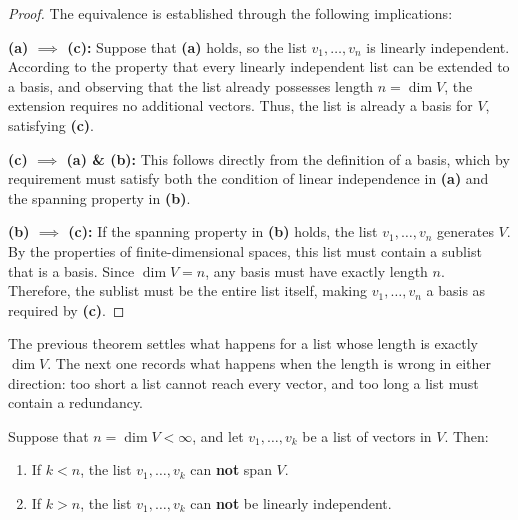 \begin{proof}
The equivalence is established through the following implications:

\textbf{(a) $\implies$ (c):} Suppose that \textbf{(a)} holds, so the list $v_1, \dots, v_n$ is linearly independent. According to the property that every linearly independent list can be extended to a basis, and observing that the list already possesses length $n = \dim V$, the extension requires no additional vectors. Thus, the list is already a basis for $V$, satisfying \textbf{(c)}.

\textbf{(c) $\implies$ (a) \& (b):} This follows directly from the definition of a basis, which by requirement must satisfy both the condition of linear independence in \textbf{(a)} and the spanning property in \textbf{(b)}.

\textbf{(b) $\implies$ (c):} If the spanning property in \textbf{(b)} holds, the list $v_1, \dots, v_n$ generates $V$. By the properties of finite-di\-men\-sional spaces, this list must contain a sublist that is a basis. Since $\dim V = n$, any basis must have exactly length $n$. Therefore, the sublist must be the entire list itself, making $v_1, \dots, v_n$ a basis as required by \textbf{(c)}.
\end{proof}



The previous theorem settles what happens for a list whose length is exactly $\dim V$. The next one records what happens when the length is wrong in either direction: too short a list cannot reach every vector, and too long a list must contain a redundancy.

\begin{theorem}
\label{thm:wrong_length_lists}
Suppose that $n = \dim V < \infty$, and let $v_1, \dots, v_k$ be a list of vectors in $V$. Then:
\begin{enumerate}[label=\textbf{(\arabic*)}]
    \item If $k < n$, the list $v_1, \dots, v_k$ can \textbf{not} span $V$.
    \item If $k > n$, the list $v_1, \dots, v_k$ can \textbf{not} be linearly independent.
\end{enumerate}
\end{theorem}

